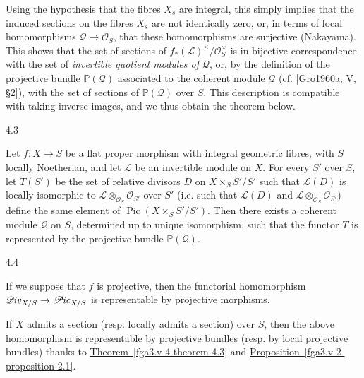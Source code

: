   Using the hypothesis that the fibres \(X_s\) are integral, this simply implies that the induced sections on the fibres \(X_s\) are not identically zero, or, in terms of local homomorphisms \(\mathscr {Q}\to \mathcal {O}_S\), that these homomorphisms are surjective (Nakayama).
  This shows that the set of sections of \(f_*(\mathscr {L})^{\times }/\mathcal {O}_S^\times \) is in bijective correspondence with the set of \emph{invertible quotient modules of \(\mathscr {Q}\)}, or, by the definition of the projective bundle \(\mathbb {P}(\mathscr {Q})\) associated to the coherent module \(\mathscr {Q}\) (cf. [\hyperref[Gro1960a]{Gro1960a}, V, §2]), with the set of sections of \(\mathbb {P}(\mathscr {Q})\) over \(S\).
  This description is compatible with taking inverse images, and we thus obtain the theorem below.\begin{theorem}{4.3}\label{fga3.v-4-theorem-4.3}\skipsinglepar\par{}Let \(f\colon  X\to  S\) be a flat proper morphism with integral geometric fibres, with \(S\) locally Noetherian, and let \(\mathscr {L}\) be an invertible module on \(X\).
    For every \(S'\) over \(S\), let \(T(S')\) be the set of relative divisors \(D\) on \(X\times _S S'/S'\) such that \(\mathscr {L}(D)\) is locally isomorphic to \(\mathscr {L}\otimes _{\mathcal {O}_S}\mathcal {O}_{S'}\) over \(S'\) (i.e. such that \(\mathscr {L}(D)\) and \(\mathscr {L}\otimes _{\mathcal {O}_S}\mathcal {O}_{S'}\)) define the same element of \(\operatorname {Pic}(X\times _S S'/S')\).
    Then there exists a coherent module \(\mathscr {Q}\) on \(S\), determined up to unique isomorphism, such that the functor \(T\) is represented by the projective bundle \(\mathbb {P}(\mathscr {Q})\).\end{theorem}\begin{corollary}{4.4}\label{fga3.v-4-corollary-4.4}\skipsinglepar\par{}If we suppose that \(f\) is projective, then the functorial homomorphism \(\mathscr {D}\kern  -1pt\mathit {iv}_{X/S}\to \mathscr {P}\kern  -1pt\mathit {ic}_{X/S}\) is representable by projective morphisms.\end{corollary}\par{}If \(X\) admits a section (resp. locally admits a section) over \(S\), then the above homomorphism is representable by projective bundles (resp. by local projective bundles) thanks to \hyperref[fga3.v-4-theorem-4.3]{Theorem~\ref*{fga3.v-4-theorem-4.3}} and \hyperref[fga3.v-2-proposition-2.1]{Proposition~\ref*{fga3.v-2-proposition-2.1}}.
